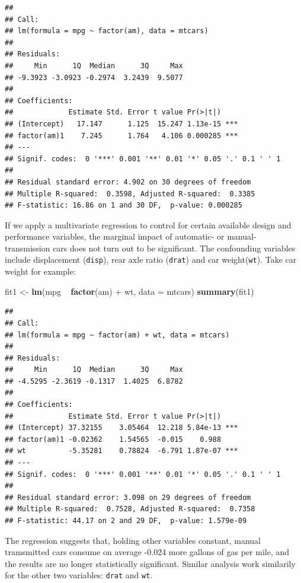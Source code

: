 \documentclass[]{article}
\newenvironment{Shaded}{\begin{snugshade}}{\end{snugshade}}
\newcommand{\KeywordTok}[1]{\textcolor[rgb]{0.13,0.29,0.53}{\textbf{{#1}}}}
\newcommand{\DataTypeTok}[1]{\textcolor[rgb]{0.13,0.29,0.53}{{#1}}}
\newcommand{\StringTok}[1]{\textcolor[rgb]{0.31,0.60,0.02}{{#1}}}
\newcommand{\NormalTok}[1]{{#1}}
\numberwithin{equation}{section}
\begin{document}
\begin{verbatim}
## 
## Call:
## lm(formula = mpg ~ factor(am), data = mtcars)
## 
## Residuals:
##     Min      1Q  Median      3Q     Max 
## -9.3923 -3.0923 -0.2974  3.2439  9.5077 
## 
## Coefficients:
##             Estimate Std. Error t value Pr(>|t|)    
## (Intercept)   17.147      1.125  15.247 1.13e-15 ***
## factor(am)1    7.245      1.764   4.106 0.000285 ***
## ---
## Signif. codes:  0 '***' 0.001 '**' 0.01 '*' 0.05 '.' 0.1 ' ' 1
## 
## Residual standard error: 4.902 on 30 degrees of freedom
## Multiple R-squared:  0.3598, Adjusted R-squared:  0.3385 
## F-statistic: 16.86 on 1 and 30 DF,  p-value: 0.000285
\end{verbatim}

If we apply a multivariate regression to control for certain available
design and performance variables, the marginal impact of automatic- or
manual- transmission cars does not turn out to be significant. The
confounding variables include displacement (\texttt{disp}), rear axle
ratio (\texttt{drat}) and car weight(\texttt{wt}). Take car weight for
example:

\begin{Shaded}
\begin{Highlighting}[]
\NormalTok{fit1 <-}\StringTok{ }\KeywordTok{lm}\NormalTok{(mpg ~}\StringTok{ }\KeywordTok{factor}\NormalTok{(am) +}\StringTok{ }\NormalTok{wt, }\DataTypeTok{data =} \NormalTok{mtcars)}
\KeywordTok{summary}\NormalTok{(fit1)}
\end{Highlighting}
\end{Shaded}

\begin{verbatim}
## 
## Call:
## lm(formula = mpg ~ factor(am) + wt, data = mtcars)
## 
## Residuals:
##     Min      1Q  Median      3Q     Max 
## -4.5295 -2.3619 -0.1317  1.4025  6.8782 
## 
## Coefficients:
##             Estimate Std. Error t value Pr(>|t|)    
## (Intercept) 37.32155    3.05464  12.218 5.84e-13 ***
## factor(am)1 -0.02362    1.54565  -0.015    0.988    
## wt          -5.35281    0.78824  -6.791 1.87e-07 ***
## ---
## Signif. codes:  0 '***' 0.001 '**' 0.01 '*' 0.05 '.' 0.1 ' ' 1
## 
## Residual standard error: 3.098 on 29 degrees of freedom
## Multiple R-squared:  0.7528, Adjusted R-squared:  0.7358 
## F-statistic: 44.17 on 2 and 29 DF,  p-value: 1.579e-09
\end{verbatim}

The regression suggests that, holding other variables constant, manual
tramsmitted cars consume on average -0.024 more gallons of gas per mile,
and the results are no longer statistically significant. Similar
analysis work similarily for the other two variables: \texttt{drat} and
\texttt{wt}.
\end{document}
